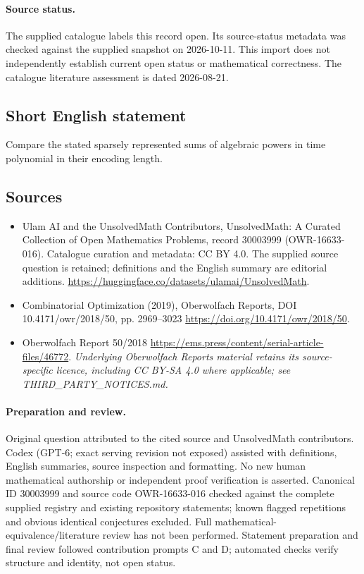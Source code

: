 \documentclass[11pt]{article}
\begin{document}
\paragraph{Source status.}
The supplied catalogue labels this record open. Its source-status metadata was checked against the supplied snapshot on 2026-10-11. This import does not independently establish current open status or mathematical correctness. The catalogue literature assessment is dated 2026-08-21.
\subsection{Short English statement}
Compare the stated sparsely represented sums of algebraic powers in time polynomial in their encoding length.
\subsection{Sources}
\begin{itemize}
\item[\hypertarget{source:30003999:1}{S1}] Ulam AI and the UnsolvedMath Contributors, UnsolvedMath: A Curated Collection of Open Mathematics Problems, record 30003999 (OWR-16633-016). Catalogue curation and metadata: CC BY 4.0. The supplied source question is retained; definitions and the English summary are editorial additions.
\url{https://huggingface.co/datasets/ulamai/UnsolvedMath}.
\item[\hypertarget{source:30003999:2}{S2}] Combinatorial Optimization (2019), Oberwolfach Reports, DOI 10.4171/owr/2018/50, pp. 2969--3023
\url{https://doi.org/10.4171/owr/2018/50}.
\item[\hypertarget{source:30003999:3}{S3}] Oberwolfach Report 50/2018
\url{https://ems.press/content/serial-article-files/46772}.
\textit{Underlying Oberwolfach Reports material retains its source-specific licence, including CC BY-SA 4.0 where applicable; see THIRD\_PARTY\_NOTICES.md.}
\end{itemize}
\paragraph{Preparation and review.}
Original question attributed to the cited source and UnsolvedMath contributors. Codex (GPT-6; exact serving revision not exposed) assisted with definitions, English summaries, source inspection and formatting. No new human mathematical authorship or independent proof verification is asserted. Canonical ID 30003999 and source code OWR-16633-016 checked against the complete supplied registry and existing repository statements; known flagged repetitions and obvious identical conjectures excluded. Full mathematical-equivalence/literature review has not been performed. Statement preparation and final review followed contribution prompts C and D; automated checks verify structure and identity, not open status.
\label{end:30003999}
\end{document}
